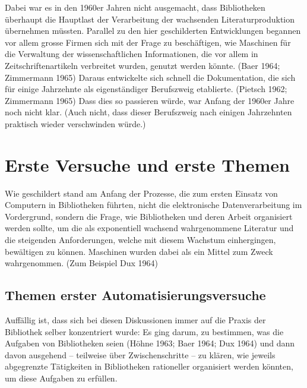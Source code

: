 \documentclass[a4paper,
fontsize=11pt,
oneside,
numbers=noperiodatend,
parskip=half-,
bibliography=totoc,
final
]{scrartcl}
\begin{document}
Dabei war es in den 1960er Jahren nicht ausgemacht, dass Bibliotheken
überhaupt die Hauptlast der Verarbeitung der wachsenden
Literaturproduktion übernehmen müssten. Parallel zu den hier
geschilderten Entwicklungen begannen vor allem grosse Firmen sich mit
der Frage zu beschäftigen, wie Maschinen für die Verwaltung der
wissenschaftlichen Informationen, die vor allem in Zeitschriftenartikeln
verbreitet wurden, genutzt werden könnte. (Baer 1964; Zimmermann 1965)
Daraus entwickelte sich schnell die Dokumentation, die sich für einige
Jahrzehnte als eigenständiger Berufszweig etablierte. (Pietsch 1962;
Zimmermann 1965) Dass dies so passieren würde, war Anfang der 1960er
Jahre noch nicht klar. (Auch nicht, dass dieser Berufszweig nach einigen
Jahrzehnten praktisch wieder verschwinden würde.)

\hypertarget{erste-versuche-und-erste-themen}{%
\section{Erste Versuche und erste
Themen}\label{erste-versuche-und-erste-themen}}

Wie geschildert stand am Anfang der Prozesse, die zum ersten Einsatz von
Computern in Bibliotheken führten, nicht die elektronische
Datenverarbeitung im Vordergrund, sondern die Frage, wie Bibliotheken
und deren Arbeit organisiert werden sollte, um die als exponentiell
wachsend wahrgenommene Literatur und die steigenden Anforderungen,
welche mit diesem Wachstum einhergingen, bewältigen zu können. Maschinen
wurden dabei als ein Mittel zum Zweck wahrgenommen. (Zum Beispiel Dux
1964)

\hypertarget{themen-erster-automatisierungsversuche}{%
\subsection{Themen erster
Automatisierungsversuche}\label{themen-erster-automatisierungsversuche}}

Auffällig ist, dass sich bei diesen Diskussionen immer auf die Praxis
der Bibliothek selber konzentriert wurde: Es ging darum, zu bestimmen,
was die Aufgaben von Bibliotheken seien (Höhne 1963; Baer 1964; Dux
1964) und dann davon ausgehend -- teilweise über Zwischenschritte -- zu
klären, wie jeweils abgegrenzte Tätigkeiten in Bibliotheken rationeller
organisiert werden könnten, um diese Aufgaben zu erfüllen.
\end{document}
